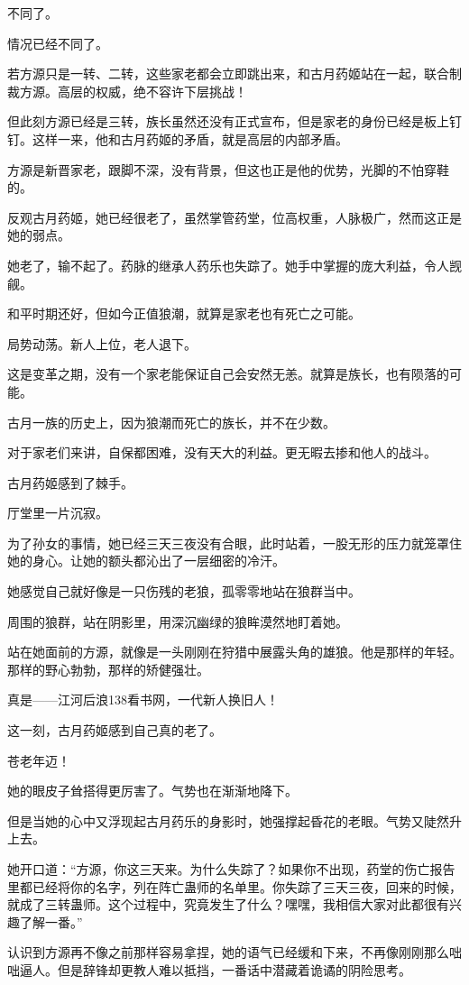 \begin{this_body}
不同了。

情况已经不同了。

若方源只是一转、二转，这些家老都会立即跳出来，和古月药姬站在一起，联合制裁方源。高层的权威，绝不容许下层挑战！

但此刻方源已经是三转，族长虽然还没有正式宣布，但是家老的身份已经是板上钉钉。这样一来，他和古月药姬的矛盾，就是高层的内部矛盾。

方源是新晋家老，跟脚不深，没有背景，但这也正是他的优势，光脚的不怕穿鞋的。

反观古月药姬，她已经很老了，虽然掌管药堂，位高权重，人脉极广，然而这正是她的弱点。

她老了，输不起了。药脉的继承人药乐也失踪了。她手中掌握的庞大利益，令人觊觎。

和平时期还好，但如今正值狼潮，就算是家老也有死亡之可能。

局势动荡。新人上位，老人退下。

这是变革之期，没有一个家老能保证自己会安然无恙。就算是族长，也有陨落的可能。

古月一族的历史上，因为狼潮而死亡的族长，并不在少数。

对于家老们来讲，自保都困难，没有天大的利益。更无暇去掺和他人的战斗。

古月药姬感到了棘手。

厅堂里一片沉寂。

为了孙女的事情，她已经三天三夜没有合眼，此时站着，一股无形的压力就笼罩住她的身心。让她的额头都沁出了一层细密的冷汗。

她感觉自己就好像是一只伤残的老狼，孤零零地站在狼群当中。

周围的狼群，站在阴影里，用深沉幽绿的狼眸漠然地盯着她。

站在她面前的方源，就像是一头刚刚在狩猎中展露头角的雄狼。他是那样的年轻。那样的野心勃勃，那样的矫健强壮。

真是——江河后浪138看书网，一代新人换旧人！

这一刻，古月药姬感到自己真的老了。

苍老年迈！

她的眼皮子耸搭得更厉害了。气势也在渐渐地降下。

但是当她的心中又浮现起古月药乐的身影时，她强撑起昏花的老眼。气势又陡然升上去。

她开口道：“方源，你这三天来。为什么失踪了？如果你不出现，药堂的伤亡报告里都已经将你的名字，列在阵亡蛊师的名单里。你失踪了三天三夜，回来的时候，就成了三转蛊师。这个过程中，究竟发生了什么？嘿嘿，我相信大家对此都很有兴趣了解一番。”

认识到方源再不像之前那样容易拿捏，她的语气已经缓和下来，不再像刚刚那么咄咄逼人。但是辞锋却更教人难以抵挡，一番话中潜藏着诡谲的阴险思考。


\end{this_body}
